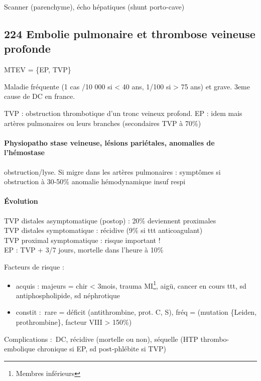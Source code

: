 \documentclass[11pt]{article}
\begin{document}
Scanner (parenchyme), écho hépatiques (shunt porto-cave)


\subsection{224 \textdagger{} Embolie pulmonaire et thrombose veineuse profonde}
\label{sec:orgf5dc94f}
\label{sec:224_embolie_pulmonaire_et_thrombose_veineuse_profonde}
\gls{MTEV} = \{\gls{EP}, \gls{TVP}\}

Maladie fréquente (1 cas /10 000 si < 40 ans, 1/100 si > 75 ans) et grave.
3eme cause de DC en france.

TVP : obstruction thrombotique d'un tronc veineux profond. EP : idem mais
artères pulmonaires ou leurs branches (secondaires TVP à 70\%)

\paragraph{Physiopatho stase veineuse, lésions pariétales, anomalies de l'hémostase \thus}
\label{sec:org280b544}
obstruction/lyse. Si migre dans les artères pulmonaires : symptômes si
obstruction à 30-50\% \thus anomalie hémodynamique \thus insuf respi

\paragraph{Évolution}
\label{sec:org752ada9}
TVP distales asymptomatique (postop) : 20\% deviennent proximales\\
TVP distales symptomatique : récidive (9\% si ttt anticoagulant)\\
TVP proximal symptomatique : risque important !\\
EP : TVP + 3/7 jours, mortelle dans l'heure à 10\%

Facteurs de risque :

\begin{itemize}
\item acquis : majeurs = chir < 3mois, trauma MI\footnote{Membres inférieurs},
\faHospital{} aigü, cancer en cours  ttt, sd antiphospholipide, sd
néphrotique
\item constit : rare = déficit (antithrombine, prot. C, S), fréq = (mutation \{Leiden,
prothrombine\}, facteur VIII > 150\%)
\end{itemize}

Complications : DC, récidive (mortelle ou non), séquelle (HTP thrombo-embolique
chronique si EP, sd post-phlébite si TVP)
\end{document}
